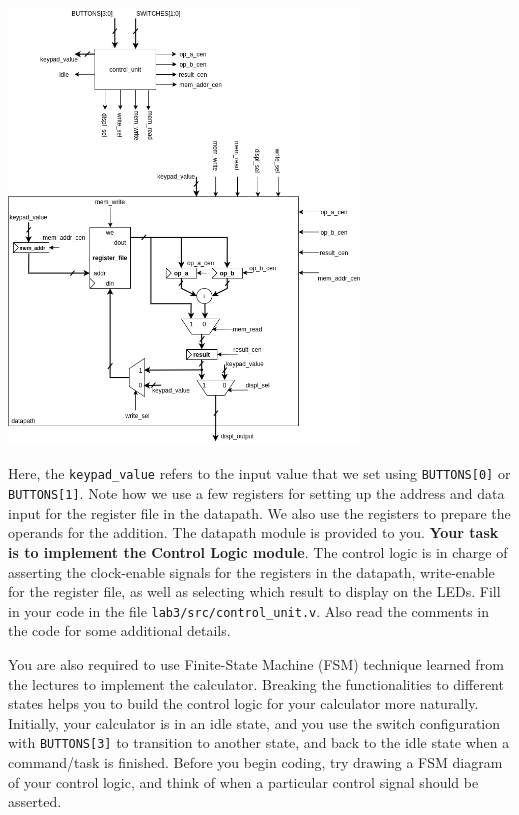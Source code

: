 \documentclass[11pt]{article}
\begin{document}
{\begin{center}
\includegraphics[width=0.7\textwidth]{figs/calculator_datapath_control.png}
\end{center}


Here, the \texttt{keypad\_value} refers to the input value that we set using \texttt{BUTTONS[0]} or \texttt{BUTTONS[1]}. Note how we use a few registers for setting up the address and data input for the register file in the datapath. We also use the registers to prepare the operands for the addition. The datapath module is provided to you. \textbf{Your task is to implement the Control Logic module}. The control logic is in charge of asserting the clock-enable signals for the registers in the datapath, write-enable for the register file, as well as selecting which result to display on the LEDs. Fill in your code in the file \verb|lab3/src/control_unit.v|. Also read the comments in the code for some additional details.

You are also required to use Finite-State Machine (FSM) technique learned from the lectures to implement the calculator. Breaking the functionalities to different states helps you to build the control logic for your calculator more naturally. Initially, your calculator is in an idle state, and you use the switch configuration with \texttt{BUTTONS[3]} to transition to another state, and back to the idle state when a command/task is finished. Before you begin coding, try drawing a FSM diagram of your control logic, and think of when a particular control signal should be asserted.

}
\end{document}
